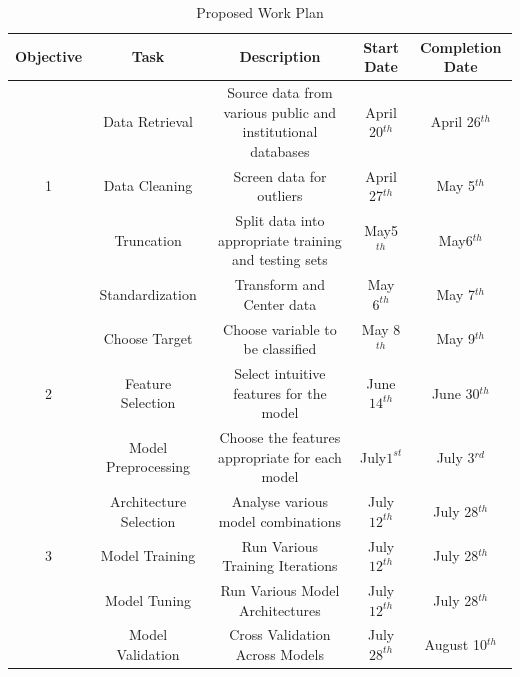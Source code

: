 \documentclass[11pt, a4paper]{article}
\begin{document}
\begin{table} \caption{Proposed Work Plan} %
\centering      %
\begin{tabular}{c | c c c c}  %
\hline                     %
Objective         & Task                &   Description                                                                               & Start Date          & Completion Date \\ [0.5ex] %
 \hline                    %
   		   & Data Retrieval        & Source data from various public and institutional databases     & April 20$^{th}$   & April 26$^{th}$\\   %
1 & Data Cleaning         & Screen data for outliers                                                         & April 27$^{th}$    & May 5$^{th}$ \\ 
    		    & Truncation              & Split data into appropriate training and testing sets                 & May5$^{th}$      & May6$^{th}$ \\ 
   		   & Standardization        & Transform and Center data                                                    & May$6^{th}$       & May 7$^{th}$ \\
\hline
   		  & Choose Target        & Choose variable to be classified                                              & May 8$^{th}$ & May 9$^{th}$\\ 
2  		& Feature Selection    & Select intuitive features for the model                                    & June$14^{th}$ & June 30$^{th}$\\ 
    		& Model Preprocessing & Choose the features appropriate for each model                    & July$1^{st}$ & July 3$^{rd}$\\
\hline
   		& Architecture Selection & Analyse various model combinations                                  & July$12^{th}$ & July 28$^{th}$ \\
  3  		& Model Training             & Run Various Training Iterations                                         & July$12^{th}$ & July 28$^{th}$ \\
		& Model Tuning               & Run Various Model Architectures                                       & July$12^{th}$ & July 28$^{th}$ \\
\hline    
    		& Model Validation           & Cross Validation Across Models                                         & July$28^{th}$ & August 10$^{th}$ \\

\end{tabular}
\end{table}
\end{document}
